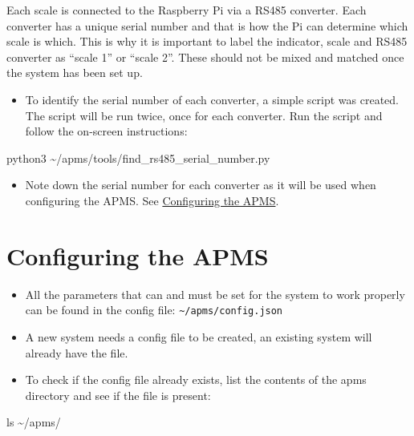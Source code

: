 \documentclass[
  letterpaper,
]{scrbook}
\newenvironment{Shaded}{\begin{snugshade}}{\end{snugshade}}
\newcommand{\FunctionTok}[1]{\textcolor[rgb]{0.28,0.35,0.67}{#1}}
\newcommand{\NormalTok}[1]{\textcolor[rgb]{0.00,0.23,0.31}{#1}}
\newcommand{\OperatorTok}[1]{\textcolor[rgb]{0.37,0.37,0.37}{#1}}
\providecommand{\tightlist}{%
  \setlength{\itemsep}{0pt}\setlength{\parskip}{0pt}}
\begin{document}
Each scale is connected to the Raspberry Pi via a RS485 converter. Each
converter has a unique serial number and that is how the Pi can
determine which scale is which. This is why it is important to label the
indicator, scale and RS485 converter as ``scale 1'' or ``scale 2''.
These should not be mixed and matched once the system has been set up.

\begin{itemize}
\tightlist
\item
  To identify the serial number of each converter, a simple script was
  created. The script will be run twice, once for each converter. Run
  the script and follow the on-screen instructions:
\end{itemize}

\begin{Shaded}
\begin{Highlighting}[]
\NormalTok{python3 }\OperatorTok{\textasciitilde{}/}\NormalTok{apms}\OperatorTok{/}\NormalTok{tools}\OperatorTok{/}\NormalTok{find\_rs485\_serial\_number.py}
\end{Highlighting}
\end{Shaded}

\begin{itemize}
\tightlist
\item
  Note down the serial number for each converter as it will be used when
  configuring the APMS. See
  \hyperref[Configuringux5cux2520theux5cux2520APMS]{Configuring the
  APMS}.
\end{itemize}

\section{Configuring the APMS}\label{configuring-the-apms}

\begin{itemize}
\item
  All the parameters that can and must be set for the system to work
  properly can be found in the config file:
  \texttt{\textasciitilde{}/apms/config.json}
\item
  A new system needs a config file to be created, an existing system
  will already have the file.
\item
  To check if the config file already exists, list the contents of the
  apms directory and see if the file is present:
\end{itemize}

\begin{Shaded}
\begin{Highlighting}[]
\FunctionTok{ls}\NormalTok{ \textasciitilde{}/apms/}
\end{Highlighting}
\end{Shaded}
\end{document}
